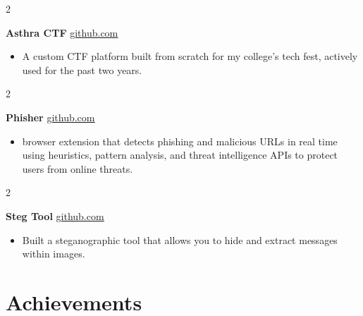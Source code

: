\documentclass[10pt, a4paper]{article}
\newenvironment{highlights}{
    \begin{itemize}[
        topsep=0.10 cm,
        parsep=0.10 cm,
        partopsep=0pt,
        itemsep=0pt,
        leftmargin=0 cm + 10pt
    ]
}{
    \end{itemize}
} %
\newenvironment{twocolentry}[2][]{
    \onecolentry
    \def\secondColumn{#2}
    \setcolumnwidth{\fill, 4.5 cm}
    \begin{paracol}{2}
}{
    \switchcolumn \raggedleft \secondColumn
    \end{paracol}
    \endonecolentry
} %
\begin{document}
        \vspace{0.01 cm}
        
        \begin{twocolentry}{
            \href{https://github.com/TimsTittus/asthra-ctf}{\underline{github.com}}
        }
            \textbf{Asthra CTF}\end{twocolentry}

        \vspace{0.01 cm}
        
            \begin{highlights}
                \item A custom CTF platform built from scratch for my college’s tech fest, actively used for the past two years.
            \end{highlights}
        
        \begin{twocolentry}{
            \href{https://github.com/TimsTittus/Phisher}{\underline{github.com}}
        }
            \textbf{Phisher}\end{twocolentry}

        \vspace{0.01 cm}
        
            \begin{highlights}
                \item browser extension that detects phishing and malicious URLs in real time using heuristics, pattern analysis, and threat intelligence APIs to protect users from online threats.
            \end{highlights}

        \begin{twocolentry}{
            \href{https://github.com/TimsTittus/Steg_Tool}{\underline{github.com}}
        }
            \textbf{Steg Tool}\end{twocolentry}

        \vspace{0.01 cm}
        
            \begin{highlights}
                \item Built a steganographic tool that allows you to hide and extract messages within images.
            \end{highlights}

        \vspace{0.01 cm}

    \section{Achievements}
    
\end{document}
